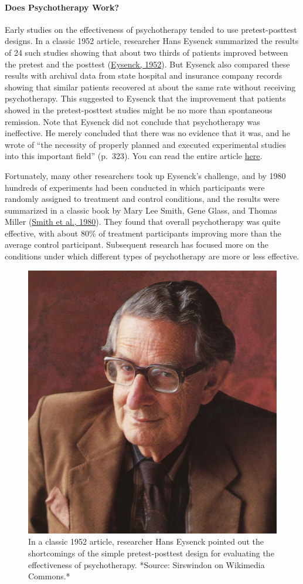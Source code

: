 \documentclass[
]{krantz}
\begin{document}
\hypertarget{does-psychotherapy-work}{%
\paragraph*{Does Psychotherapy Work?}\label{does-psychotherapy-work}}

Early studies on the effectiveness of psychotherapy tended to use pretest-posttest designs. In a classic 1952 article, researcher Hans Eysenck summarized the results of 24 such studies showing that about two thirds of patients improved between the pretest and the posttest (\protect\hyperlink{ref-eysenck1952effects}{Eysenck, 1952}). But Eysenck also compared these results with archival data from state hospital and insurance company records showing that similar patients recovered at about the same rate without receiving psychotherapy. This suggested to Eysenck that the improvement that patients showed in the pretest-posttest studies might be no more than spontaneous remission. Note that Eysenck did not conclude that psychotherapy was ineffective. He merely concluded that there was no evidence that it was, and he wrote of ``the necessity of properly planned and executed experimental studies into this important field'' (p.~323). You can read the entire article \href{http://psychclassics.yorku.ca/Eysenck/psychotherapy.htm}{here}.

Fortunately, many other researchers took up Eysenck's challenge, and by 1980 hundreds of experiments had been conducted in which participants were randomly assigned to treatment and control conditions, and the results were summarized in a classic book by Mary Lee Smith, Gene Glass, and Thomas Miller (\protect\hyperlink{ref-smith1980benefits}{Smith et al., 1980}). They found that overall psychotherapy was quite effective, with about 80\% of treatment participants improving more than the average control participant. Subsequent research has focused more on the conditions under which different types of psychotherapy are more or less effective.

\begin{figure}

{\centering \includegraphics[width=0.35\linewidth]{images/nonexperiments/eysenck} 

}

\caption{In a classic 1952 article, researcher Hans Eysenck pointed out the shortcomings of the simple pretest-posttest design for evaluating the effectiveness of psychotherapy. *Source: Sirswindon on Wikimedia Commons.*}\label{fig:eysenck}
\end{figure}
\end{document}
